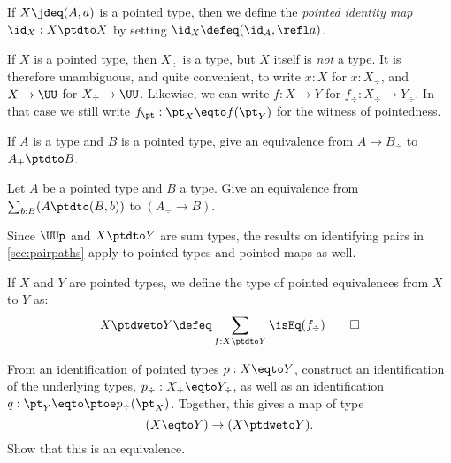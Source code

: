 \begin{definition}\label{def:pointedidentity}
  If $X \jdeq (A,a)$ is a pointed type, then we define the \emph{pointed identity map}
  $\id_X : X \ptdto X$ by setting $\id_X \defeq (\id_A, \refl a)$.
\end{definition}

\begin{remark}\label{rem:coerceawaypt}
If $X$ is a pointed type, then $X_\div $ is a type, but $X$ itself is
\emph{not} a type. It is therefore unambiguous, and quite convenient,
to write $x:X$ for $x:X_\div$, and $X\to\UU$ for $X_\div\to\UU$.
Likewise, we can write $f : X \to Y$ for $f_\div : X_\div \to Y_\div$.
In that case we still write $f_\pt : \pt_X \eqto f(\pt_Y)$ for the
witness of pointedness.
\end{remark}

\begin{xca}\label{xca:plusforgetadjoint}
If $A$ is a type and $B$ is a pointed type,
give an equivalence from $A\to B_\div$ to $A_+\ptdto B$.
\end{xca}

\begin{xca}\label{xca:freemaps}
  Let $A$ be a pointed type and $B$ a type. Give an equivalence from
  $\sum_{b:B}(A\ptdto (B,b))$ to $(A_\div\to B)$.
\end{xca}

Since $\UUp$ and $X\ptdto Y$ are sum types, the results on identifying pairs
in \cref{sec:pairpaths} apply to pointed types and pointed maps as well.

\begin{definition}\label{def:pointedequiv}
  If $X$ and $Y$ are pointed types, we define the type of pointed equivalences
  from $X$ to $Y$ as:
  \[
    X \ptdweto Y \defeq \sum_{f : X \ptdto Y}\isEq(f_\div)\qedhere
  \]
\end{definition}
\begin{xca}\label{xca:pointedequiv}
  From an identification of pointed types $p : X \eqto Y$,
  construct an identification of the underlying types, $p_\div : X_\div \eqto Y_\div$,
  as well as an identification $q : \pt_Y \eqto \ptoe p_\div(\pt_X)$.
  Together, this gives a map of type
  \[
    (X \eqto Y) \to (X \ptdweto Y).
  \]
  Show that this is an equivalence.
\end{xca}


